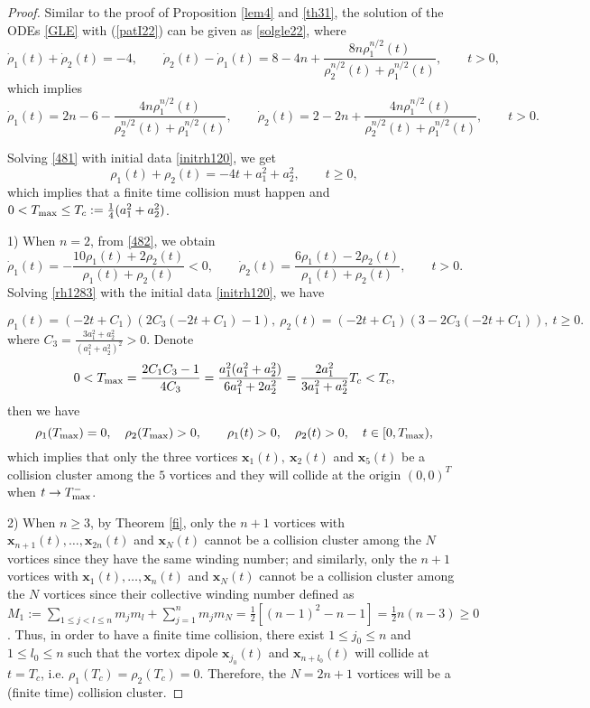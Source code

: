 \documentclass{aims}
\theoremstyle{plain}
\theoremstyle{definition}
\newcommand{\be} {\begin{equation}}
\newcommand{\ee}{\end{equation}}
\begin{document}
\begin{proof} Similar to the proof of Proposition \ref{lem4} and \ref{th31},
the solution of the ODEs
\eqref{GLE} with (\ref{patI22}) can be given as
 \eqref{solgle22}, where
\begin{equation}\label{481}
\dot\rho_1(t)+\dot\rho_2(t)=-4, \qquad
\dot\rho_2(t)-\dot\rho_1(t)=8-4n+\frac{
8n\rho_1^{n/2}(t)}{\rho_2^{n/2}(t)+\rho_1^{n/2}(t)}, \qquad t>0,
\end{equation}
which implies
\be\label{482}
\dot\rho_1(t)=2n-6-\frac{4n\rho_1^{n/2}(t)}
{\rho_2^{n/2}(t)+\rho_1^{n/2}(t)},\qquad \dot\rho_2(t)=2-2n+\frac{4n
\rho_1^{n/2}(t)}
{\rho_2^{n/2}(t)+\rho_1^{n/2}(t)},\qquad t>0.
\ee

Solving \eqref{481} with initial data \eqref{initrh120}, we get
\be
\rho_1(t)+\rho_2(t)=-4t+a_1^2+a_2^2, \qquad t\ge0, \nonumber
\ee
which implies that a finite time collision must happen and
$0<T_{\rm max}\le T_c:=\frac{1}{4}(a_1^2+a_2^2)$.

1) When $n=2$, from \eqref{482}, we obtain
\be\label{rh1283}
\dot\rho_1(t)=-\frac{10\rho_1(t)+2\rho_2(t)}{\rho_1(t)+\rho_2(t)}<0,
\qquad \dot\rho_2(t)=\frac{6\rho_1(t)-2\rho_2(t)}{\rho_1(t)+\rho_2(t)},
\qquad t>0.
\ee
Solving \eqref{rh1283} with the initial data \eqref{initrh120}, we have

\begin{equation*}
\rho_1(t)=(-2t+C_1)(2C_3(-2t+C_1)-1) ,\
  \rho_2(t)=(-2t+C_1)(3-2C_3(-2t+C_1)), \ t\ge0.
\end{equation*}
where $C_3=\frac{3a_1^2+a_2^2}{(a_1^2+a_2^2)^2}>0$.
Denote
\be
0<T_{\rm max}=\frac{2C_1C_3-1}{4C_3}=\frac{a_1^2(a_1^2+a_2^2)}
{6a_1^2+2a_2^2}=\frac{2a_1^2}
{3a_1^2+a_2^2}T_c<T_c, \nonumber
\ee then we have
\be
\rho_1(T_{\rm max})=0,\quad \rho_2(T_{\rm max})>0,\qquad   \rho_1(t)>0,\quad \rho_2(t)>0,
\quad t\in [0,T_{\rm max}), \nonumber
\ee
which implies that only the three vortices $\mathbf x_1(t),\ \mathbf x_2(t)$ and $\mathbf x_5(t)$  be a collision cluster among the $5$ vortices
and they will
collide at the origin $(0,0)^T$ when $t\to T_{\rm max}^-$.


2) When $n\geq 3$, by Theorem \ref{fi}, only the $n+1$ vortices
with $\mathbf x_{n+1}(t),\ldots,\mathbf x_{2n}(t)$ and $\mathbf x_N(t)$  cannot be a collision cluster among
the $N$ vortices since they have the same winding number; and similarly, only the $n+1$ vortices
with $\mathbf x_1(t),\ldots,\mathbf x_n(t)$ and $\mathbf x_N(t)$
 cannot be a collision cluster among the $N$ vortices since
their collective winding number defined as $M_1:=\sum_{1\le j<l\le n}m_jm_l+\sum_{j=1}^n m_jm_N=\frac{1}{2}[(n-1)^2-n-1]=\frac{1}{2}n(n-3)\ge0$.
Thus, in order to have a finite time collision,
there exist $1\leq j_0\leq n$ and $1\leq l_0\leq
n$ such that the vortex dipole $\mathbf x_{j_0}(t)$ and $\mathbf
x_{n+l_0}(t)$ will collide at $t=T_c$, i.e. $\rho_1(T_c)=\rho_2(T_c)=0$.
Therefore, the $N=2n+1$ vortices will be a (finite time) collision cluster.


\end{proof}
\end{document}
